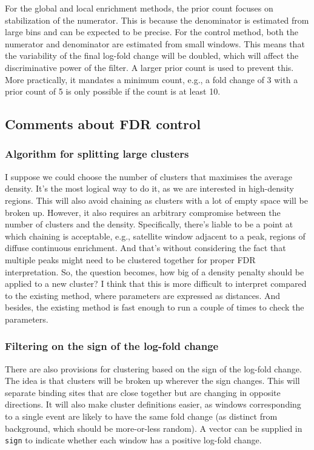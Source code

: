 \documentclass[12pt]{report}
\newcommand{\code}[1]{{\small\texttt{#1}}}
\begin{document}
For the global and local enrichment methods, the prior count focuses on stabilization of the numerator.
This is because the denominator is estimated from large bins and can be expected to be precise.
For the control method, both the numerator and denominator are estimated from small windows.
This means that the variability of the final log-fold change will be doubled, which will affect the discriminative power of the filter.
A larger prior count is used to prevent this.
More practically, it mandates a minimum count, e.g., a fold change of 3 with a prior count of 5 is only possible if the count is at least 10.

\subsection*{Comments about FDR control}

\subsubsection*{Algorithm for splitting large clusters}

I suppose we could choose the number of clusters that maximises the average density. 
It's the most logical way to do it, as we are interested in high-density regions. 
This will also avoid chaining as clusters with a lot of empty space will be broken up. 
However, it also requires an arbitrary compromise between the number of clusters and the density. 
Specifically, there's liable to be a point at which chaining is acceptable, e.g., satellite window adjacent to a peak, regions of diffuse continuous enrichment. 
And that's without considering the fact that multiple peaks might need to be clustered together for proper FDR interpretation. 
So, the question becomes, how big of a density penalty should be applied to a new cluster? 
I think that this is more difficult to interpret compared to the existing method, where parameters are expressed as distances. 
And besides, the existing method is fast enough to run a couple of times to check the parameters.

\subsubsection*{Filtering on the sign of the log-fold change}
There are also provisions for clustering based on the sign of the log-fold change. 
The idea is that clusters will be broken up wherever the sign changes. 
This will separate binding sites that are close together but are changing in opposite directions. 
It will also make cluster definitions easier, as windows corresponding to a single event are likely to have the same fold change (as distinct from background, which should be more-or-less random).
A vector can be supplied in \code{sign} to indicate whether each window has a positive log-fold change.
\end{document}
